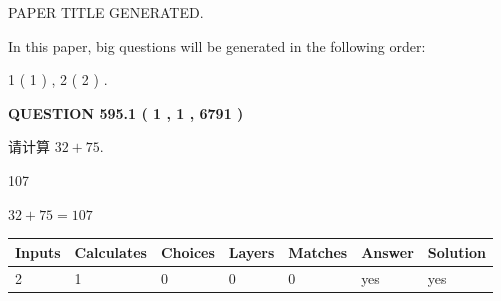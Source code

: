 \documentclass{ctexart}
\begin{document}
   
\vspace{0.2in}
   
   
   
   
   
   
   
   
 \vspace{0.2in}
 
 
 
 
   
   
 PAPER TITLE GENERATED.
   
   
   
\vspace{0.2in}
   
In this paper, big questions will be generated in the following order: 
   
   
   1 ( 1 )
 ,
   2 ( 2 )
 .
  
\vspace{0.2in}
  
{\textbf{\Large{QUESTION
595.1 
 ( 1 , 1 , 6791 )
}}}
  
  
 
请计算 $ %
32 +  %
75 $.
 
 
 
\noindent{}
 
 

107
 
 
\noindent{}
 
 

 
 
 
\noindent{}
 
 

$ %
32 +  %
75=   %
107$
 
 
\noindent{}
 
 

 
   
   
   
   
\noindent\begin{tabular}{|l|l|l|l|l|l|l|}
 \hline
Inputs & Calculates & Choices & Layers & Matches & Answer & Solution \\ \hline
 2  & 
 1  & 
 0
  & 
 0  & 
 0  & 
  yes & 
  yes 
  \\ \hline
 \end{tabular}
   
\end{document}
